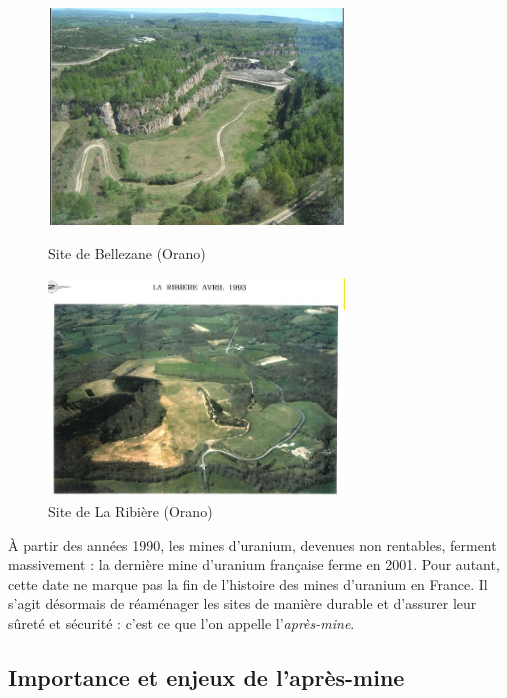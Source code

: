 \documentclass{article}
\begin{document}
\begin{figure}[H]
    \centering
    \begin{minipage}{0.5\textwidth}
        \centering
        \includegraphics[width=0.7\textwidth]{I_A_3.jpg} 
        \caption{Site de Bellezane (Orano)}
        \label{fig:bellezane1}
    \end{minipage}\hfill
    \begin{minipage}{0.5\textwidth}
        \centering
        \includegraphics[width=0.7\textwidth]{I_A_4.jpg} 
        \caption{Site de La Ribière (Orano)}
        \label{fig:ribiere1}
    \end{minipage}
\end{figure}


À partir des années 1990, les mines d’uranium, devenues non rentables, ferment massivement : la dernière mine d’uranium française ferme en 2001. Pour autant, cette date ne marque pas la fin de l’histoire des mines d’uranium en France. Il s’agit désormais de réaménager les sites de manière durable et d'assurer leur sûreté et sécurité : c’est ce que l’on appelle l’\emph{après-mine}.


\subsection{Importance et enjeux de l'après-mine}
\end{document}

